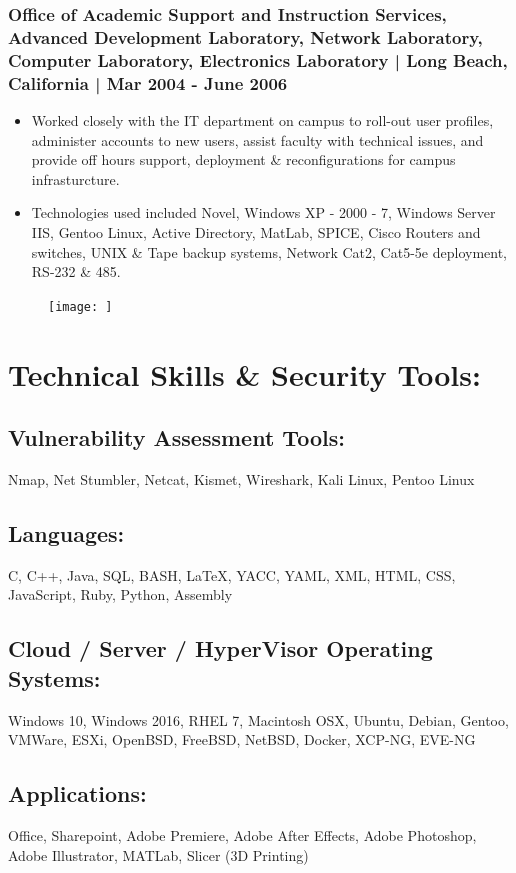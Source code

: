 \documentclass[letter,10pt]{article}
\begin{document}
\subsubsection*{Office of Academic Support and Instruction Services, Advanced Development Laboratory, Network Laboratory, Computer Laboratory, Electronics Laboratory | Long Beach, California | Mar 2004 - June 2006}
\label{sec:org0028ae2}
\begin{itemize}
\item Worked closely with the IT department on campus to roll-out user profiles, administer accounts to new users, assist faculty with technical issues, and provide off hours support, deployment \& reconfigurations for campus infrasturcture.
\item Technologies used included Novel, Windows XP - 2000 - 7, Windows Server IIS, Gentoo Linux, Active Directory, MatLab, SPICE, Cisco Routers and switches, UNIX \& Tape backup systems, Network Cat2, Cat5-5e deployment, RS-232 \& 485.
\end{itemize}
\begin{figure}
\texttt{[image: ]}
\end{figure}

\section*{Technical Skills \& Security Tools:}
\label{sec:org747e4cc}
\subsection*{Vulnerability Assessment Tools:}
\label{sec:orgbf4bc4a}
Nmap, Net Stumbler, Netcat, Kismet, Wireshark, Kali Linux, Pentoo Linux
\subsection*{Languages:}
\label{sec:orgaf435c9}
C, C++, Java, SQL, BASH, \LaTeX{}, YACC, YAML, XML, HTML, CSS, JavaScript, Ruby, Python, Assembly
\subsection*{Cloud / Server / HyperVisor Operating Systems:}
\label{sec:org2e24e14}
Windows 10, Windows 2016, RHEL 7, Macintosh OSX, Ubuntu, Debian, Gentoo, VMWare, ESXi, OpenBSD, FreeBSD, NetBSD, Docker, XCP-NG, EVE-NG
\subsection*{Applications:}
\label{sec:org0033e0d}
Office, Sharepoint, Adobe Premiere, Adobe After Effects, Adobe Photoshop, Adobe Illustrator, MATLab, Slicer (3D Printing)
\end{document}
